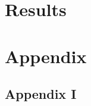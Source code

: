 \chapter{Results}



\begingroup
\raggedright



%
%

\endgroup

\appendix
\chapter{Appendix}
\section{Appendix I}\label{sec:KOOS}
%



